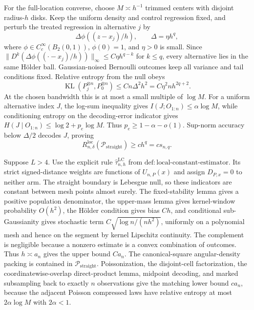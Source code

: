 For the full-location converse, choose \(M\asymp h^{-1}\) trimmed centers with disjoint radius-\(h\) disks.  Keep the uniform density and control regression fixed, and perturb the treated regression in alternative \(j\) by
\[
\Delta\phi((z-x_j)/h),\qquad \Delta=\eta h^q,
\]
where \(\phi\in C_c^\infty(B_2(0,1))\), \(\phi(0)=1\), and \(\eta>0\) is small.  Since \(\lVert D^k(\Delta\phi((\cdot-x_j)/h))\rVert_\infty\leq C\eta h^{q-k}\) for \(k\leq q\), every alternative lies in the same H\"older ball.  Gaussian-noised Bernoulli outcomes keep all variance and tail conditions fixed.  Relative entropy from the null obeys
\[
\operatorname{KL}(P_j^{\otimes n},P_0^{\otimes n})
\leq Cn\Delta^2h^2=C\eta^2nh^{2q+2}.
\]
At the chosen bandwidth this is at most a small multiple of \(\log M\).  For a uniform alternative index \(J\), the log-sum inequality gives \(I(J;O_{1:n})\leq\alpha\log M\), while conditioning entropy on the decoding-error indicator gives \(H(J\mid O_{1:n})\leq\log2+p_e\log M\).  Thus \(p_e\geq1-\alpha-o(1)\).  Sup-norm accuracy below \(\Delta/2\) decodes \(J\), proving
\[
R_{n,\delta}^{\mathrm{loc}}(\mathcal P_{\mathrm{straight}})\geq c h^q=cs_{n,q}.
\]

Suppose \(L>4\).  Use the explicit rule \(\widehat\tau^{\mathrm{LC}}_{n,h}\) from \(\mathrm{def:local\text{-}constant\text{-}estimator}\).  Its strict signed-distance weights are functions of \(U_{n,P}(x)\) and assign \(D_{P,x}=0\) to neither arm.  The straight boundary is Lebesgue null, so these indicators are constant between mesh points almost surely.  The fixed-stability lemma gives a positive population denominator, the upper-mass lemma gives kernel-window probability \(O(h^2)\), the H\"older condition gives bias \(Ch\), and conditional sub-Gaussianity gives stochastic term \(C\sqrt{\log n/(nh^2)}\), uniformly on a polynomial mesh and hence on the segment by kernel Lipschitz continuity.  The complement is negligible because a nonzero estimate is a convex combination of outcomes.  Thus \(h\asymp a_n\) gives the upper bound \(Ca_n\).  The canonical-square angular-density packing is contained in \(\mathcal P_{\mathrm{straight}}\).  Poissonization, the disjoint-cell factorization, the coordinatewise-overlap direct-product lemma, midpoint decoding, and marked subsampling back to exactly \(n\) observations give the matching lower bound \(ca_n\), because the adjacent Poisson compressed laws have relative entropy at most \(2\alpha\log M\) with \(2\alpha<1\).

